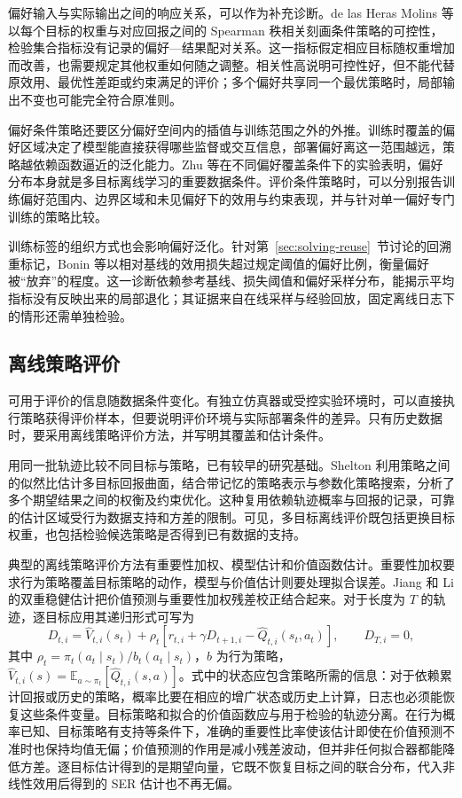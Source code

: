 偏好输入与实际输出之间的响应关系，可以作为补充诊断。de las Heras Molins 等以每个目标的权重与对应回报之间的 Spearman 秩相关刻画条件策略的可控性，检验集合指标没有记录的偏好—结果配对关系\cite{heras2026controllability}。这一指标假定相应目标随权重增加而改善，也需要规定其他权重如何随之调整。相关性高说明可控性好，但不能代替原效用、最优性差距或约束满足的评价；多个偏好共享同一个最优策略时，局部输出不变也可能完全符合原准则。

偏好条件策略还要区分偏好空间内的插值与训练范围之外的外推。训练时覆盖的偏好区域决定了模型能直接获得哪些监督或交互信息，部署偏好离这一范围越远，策略越依赖函数逼近的泛化能力。Zhu 等在不同偏好覆盖条件下的实验表明，偏好分布本身就是多目标离线学习的重要数据条件\cite{zhu2023}。评价条件策略时，可以分别报告训练偏好范围内、边界区域和未见偏好下的效用与约束表现，并与针对单一偏好专门训练的策略比较。

训练标签的组织方式也会影响偏好泛化。针对第~\ref{sec:solving-reuse}~节讨论的回溯重标记，Bonin 等以相对基线的效用损失超过规定阈值的偏好比例，衡量偏好被“放弃”的程度\cite{bonin2026collapse}。这一诊断依赖参考基线、损失阈值和偏好采样分布，能揭示平均指标没有反映出来的局部退化；其证据来自在线采样与经验回放，固定离线日志下的情形还需单独检验。

\subsection{离线策略评价}\label{sec:eval-offline}

可用于评价的信息随数据条件变化。有独立仿真器或受控实验环境时，可以直接执行策略获得评价样本，但要说明评价环境与实际部署条件的差异。只有历史数据时，要采用离线策略评价方法，并写明其覆盖和估计条件。

用同一批轨迹比较不同目标与策略，已有较早的研究基础。Shelton 利用策略之间的似然比估计多目标回报曲面，结合带记忆的策略表示与参数化策略搜索，分析了多个期望结果之间的权衡及约束优化\cite{shelton2001importance}。这种复用依赖轨迹概率与回报的记录，可靠的估计区域受行为数据支持和方差的限制。可见，多目标离线评价既包括更换目标权重，也包括检验候选策略是否得到已有数据的支持。

典型的离线策略评价方法有重要性加权、模型估计和价值函数估计。重要性加权要求行为策略覆盖目标策略的动作，模型与价值估计则要处理拟合误差。Jiang 和 Li 的双重稳健估计把价值预测与重要性加权残差校正结合起来\cite{jiang2016}。对于长度为 $T$ 的轨迹，逐目标应用其递归形式可写为
\begin{equation}
D_{t,i}
=\widehat V_{t,i}(s_t)
+\rho_t\left[r_{t,i}+\gamma D_{t+1,i}
-\widehat Q_{t,i}(s_t,a_t)\right],\qquad D_{T,i}=0,
\end{equation}
其中 $\rho_t=\pi_t(a_t\mid s_t)/b_t(a_t\mid s_t)$，$b$ 为行为策略，$\widehat V_{t,i}(s)=\mathbb E_{a\sim\pi_t}[\widehat Q_{t,i}(s,a)]$。式中的状态应包含策略所需的信息：对于依赖累计回报或历史的策略，概率比要在相应的增广状态或历史上计算，日志也必须能恢复这些条件变量。目标策略和拟合的价值函数应与用于检验的轨迹分离。在行为概率已知、目标策略有支持等条件下，准确的重要性比率使该估计即使在价值预测不准时也保持均值无偏；价值预测的作用是减小残差波动，但并非任何拟合器都能降低方差。逐目标估计得到的是期望向量，它既不恢复目标之间的联合分布，代入非线性效用后得到的 SER 估计也不再无偏。

